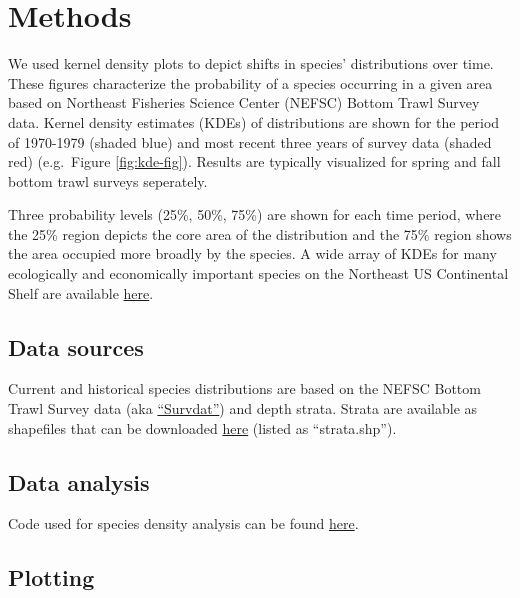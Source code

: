 \documentclass[
]{book}
\begin{document}
\hypertarget{methods-37}{%
\section{Methods}\label{methods-37}}

We used kernel density plots to depict shifts in species' distributions over time. These figures characterize the probability of a species occurring in a given area based on Northeast Fisheries Science Center (NEFSC) Bottom Trawl Survey data. Kernel density estimates (KDEs) of distributions are shown for the period of 1970-1979 (shaded blue) and most recent three years of survey data (shaded red) (e.g.~Figure \ref{fig:kde-fig}). Results are typically visualized for spring and fall bottom trawl surveys seperately.

Three probability levels (25\%, 50\%, 75\%) are shown for each time period, where the 25\% region depicts the core area of the distribution and the 75\% region shows the area occupied more broadly by the species. A wide array of KDEs for many ecologically and economically important species on the Northeast US Continental Shelf are available \href{https://www.nefsc.noaa.gov/ecosys/current-conditions/kernel-density.html}{here}.

\hypertarget{data-sources-37}{%
\subsection{Data sources}\label{data-sources-37}}

Current and historical species distributions are based on the NEFSC Bottom Trawl Survey data (aka \protect\hyperlink{survdat}{``Survdat''}) and depth strata. Strata are available as shapefiles that can be downloaded \href{https://github.com/NOAA-EDAB/tech-doc/tree/master/gis}{here} (listed as
``strata.shp'').

\hypertarget{data-analysis-35}{%
\subsection{Data analysis}\label{data-analysis-35}}

Code used for species density analysis can be found \href{https://github.com/NOAA-EDAB/tech-doc/blob/master/R/stored_scripts/species_density_analysis.R}{here}.

\hypertarget{plotting-30}{%
\subsection{Plotting}\label{plotting-30}}
\end{document}
